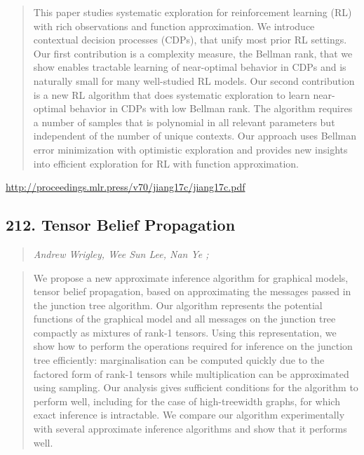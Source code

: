 \documentclass{article}
\begin{document}
\begin{quote}
    This paper studies systematic exploration for reinforcement learning (RL) with rich observations and function approximation. We introduce contextual decision processes (CDPs), that unify most prior RL settings. Our first contribution is a complexity measure, the Bellman rank, that we show enables tractable learning of near-optimal behavior in CDPs and is naturally small for many well-studied RL models. Our second contribution is a new RL algorithm that does systematic exploration to learn near-optimal behavior in CDPs with low Bellman rank. The algorithm requires a number of samples that is polynomial in all relevant parameters but independent of the number of unique contexts. Our approach uses Bellman error minimization with optimistic exploration and provides new insights into efficient exploration for RL with function approximation.  \end{quote}

\href{http://proceedings.mlr.press/v70/jiang17c/jiang17c.pdf}{http://proceedings.mlr.press/v70/jiang17c/jiang17c.pdf}

\subsection{212. Tensor Belief Propagation}

\begin{quote}
\footnotesize{\textit{Andrew Wrigley, Wee Sun Lee, Nan Ye ;}}
\end{quote}

\begin{quote}
    We propose a new approximate inference algorithm for graphical models, tensor belief propagation, based on approximating the messages passed in the junction tree algorithm. Our algorithm represents the potential functions of the graphical model and all messages on the junction tree compactly as mixtures of rank-1 tensors. Using this representation, we show how to perform the operations required for inference on the junction tree efficiently: marginalisation can be computed quickly due to the factored form of rank-1 tensors while multiplication can be approximated using sampling. Our analysis gives sufficient conditions for the algorithm to perform well, including for the case of high-treewidth graphs, for which exact inference is intractable. We compare our algorithm experimentally with several approximate inference algorithms and show that it performs well.  \end{quote}
\end{document}
